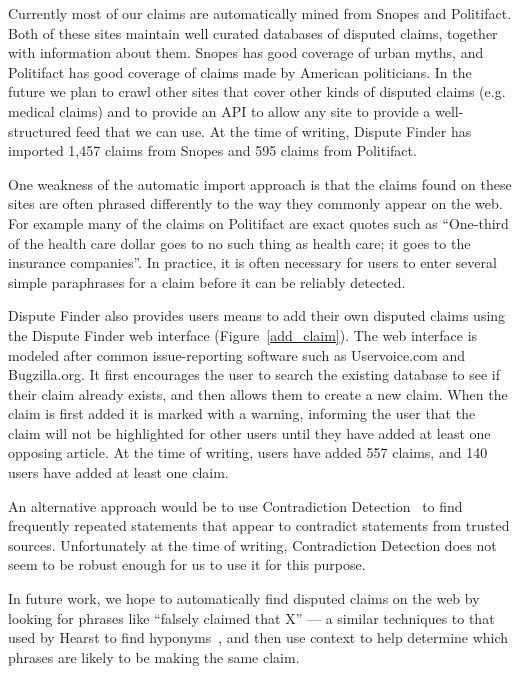 \documentclass{www2010-submission}
\begin{document}
Currently most of our claims are automatically mined from Snopes and Politifact. Both of these sites maintain well curated databases of disputed claims, together with information about them. Snopes has good coverage of urban myths, and Politifact has good coverage of claims made by American politicians. In the future we plan to crawl other sites that cover other kinds of disputed claims (e.g. medical claims) and to provide an API to allow any site to provide a well-structured feed that we can use. At the time of writing, Dispute Finder has imported 1,457 claims from Snopes and 595 claims from Politifact.

One weakness of the automatic import approach is that the claims found on these sites are often phrased differently to the way they commonly appear on the web. For example many of the claims on Politifact are exact quotes such as ``One-third of the health care dollar goes to no such thing as health care; it goes to the insurance companies''. In practice, it is often necessary for users to enter several simple paraphrases for a claim before it can be reliably detected.

Dispute Finder also provides users means to add their own disputed claims using the Dispute Finder web interface (Figure~\ref{add_claim}). The web interface is modeled after common issue-reporting software such as Uservoice.com and Bugzilla.org. It first encourages the user to search the existing database to see if their claim already exists, and then allows them to create a new claim. When the claim is first added it is marked with a warning, informing the user that the claim will not be highlighted for other users until they have added at least one opposing article. At the time of writing, users have added 557 claims, and 140 users have added at least one claim.


An alternative approach would be to use Contradiction Detection~\cite{Ritter} to find frequently repeated statements that appear to contradict statements from trusted sources. Unfortunately at the time of writing, Contradiction Detection does not seem to be robust enough for us to use it for this purpose.

In future work, we hope to automatically find disputed claims on the web by looking for phrases like ``falsely claimed that X'' --- a similar techniques to that used by Hearst to find hyponyms~\cite{Hearst1992}, and then use context to help determine which phrases are likely to be making the same claim.
\end{document}
